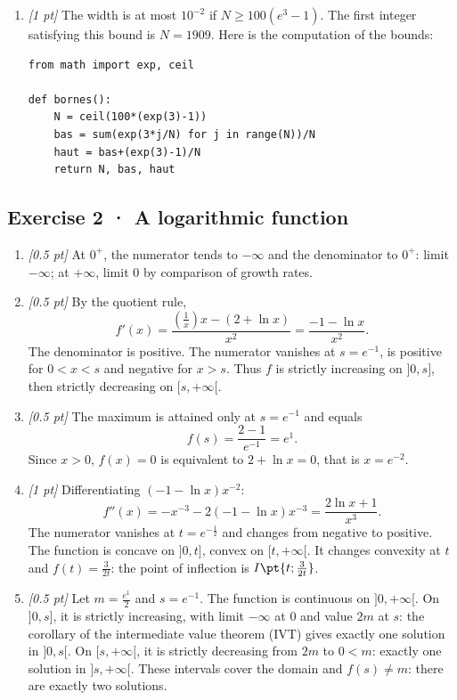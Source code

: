 \begin{enumerate}

\item \textit{[1 pt]} The width is at most $10^{-2}$ if $N\ge100(e^{3}-1)$. The first integer satisfying this bound is $N=1909$. Here is the computation of the bounds:
\begin{lstlisting}
from math import exp, ceil

def bornes():
    N = ceil(100*(exp(3)-1))
    bas = sum(exp(3*j/N) for j in range(N))/N
    haut = bas+(exp(3)-1)/N
    return N, bas, haut
\end{lstlisting}


\end{enumerate}

\subsection*{Exercise 2 · A logarithmic function}\begin{enumerate}

\item \textit{[0.5 pt]} At $0^+$, the numerator tends to $-\infty$ and the denominator to $0^+$: limit $-\infty$; at $+\infty$, limit $0$ by comparison of growth rates.

\item \textit{[0.5 pt]} By the quotient rule,
\[f'(x)=\frac{(\frac{1}{x})x-(2+\ln x)}{x^2}=\frac{-1-\ln x}{x^2}.\]
The denominator is positive. The numerator vanishes at $s=e^{-1}$, is positive for $0<x<s$ and negative for $x>s$. Thus $f$ is strictly increasing on $]0,s]$, then strictly decreasing on $[s,+\infty[$.

\item \textit{[0.5 pt]} The maximum is attained only at $s=e^{-1}$ and equals
\[f(s)=\frac{2- 1}{e^{-1}}=e^{1}.\]
Since $x>0$, $f(x)=0$ is equivalent to $2+\ln x=0$, that is $x=e^{-2}$.

\item \textit{[1 pt]} Differentiating $(-1-\ln x)x^{-2}$:
\[f''(x)=-x^{-3}-2(-1-\ln x)x^{-3}=\frac{2\ln x+1}{x^3}.\]
The numerator vanishes at $t=e^{-\frac{1}{2}}$ and changes from negative to positive. The function is concave on $]0,t]$, convex on $[t,+\infty[$. It changes convexity at $t$ and $f(t)=\frac{3}{2t}$: the point of inflection is $I\pt{t;\frac{3}{2t}}$.

\item \textit{[0.5 pt]} Let $m=\frac{e^{1}}{2}$ and $s=e^{-1}$. The function is continuous on $]0,+\infty[$. On $]0,s]$, it is strictly increasing, with limit $-\infty$ at $0$ and value $2m$ at $s$: the corollary of the intermediate value theorem (IVT) gives exactly one solution in $]0,s[$. On $[s,+\infty[$, it is strictly decreasing from $2m$ to $0<m$: exactly one solution in $]s,+\infty[$. These intervals cover the domain and $f(s)\ne m$: there are exactly two solutions.


\end{enumerate}
